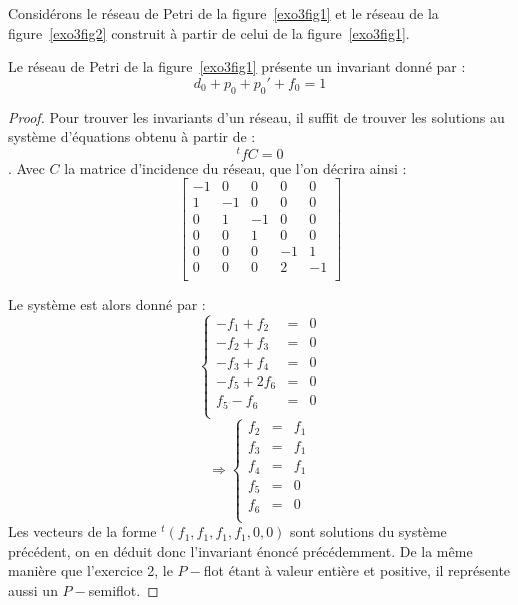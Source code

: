Considérons le réseau de Petri de la figure~\ref{exo3fig1} et le réseau de la figure~\ref{exo3fig2}
construit à partir de celui de la figure~\ref{exo3fig1}.

\begin{thrm}
    Le réseau de Petri de la figure~\ref{exo3fig1} présente un invariant donné par :
    \[
        d_0 + p_0 + p_0' + f_0 = 1 
    \]
\end{thrm}

\begin{proof}
    Pour trouver les invariants d'un réseau, il suffit de trouver les solutions au système
    d'équations obtenu à partir de : \[
        ^tfC = 0
    \]. Avec $C$ la matrice d'incidence du réseau, que l'on décrira ainsi :
    \[
        \left [ \begin{array}{ccccc}
            -1 & 0 & 0 & 0 & 0 \\
            1 & -1 & 0 & 0 & 0 \\
            0 & 1 & -1 & 0 & 0 \\
            0 & 0 & 1 & 0 & 0 \\
            0 & 0 & 0 & -1 & 1 \\
            0 & 0 & 0 & 2 & -1 \\
        \end{array}
        \right ]
    \]

    Le système est alors donné par : \[
        \left \lbrace \begin{array}{rcl}
            -f_1 + f_2 & = & 0 \\
            -f_2 + f_3 & = & 0 \\
            -f_3 + f_4 & = & 0 \\
            -f_5 + 2f_6 & = & 0 \\
            f_5 - f_6 & = & 0 \\
        \end{array}
        \right .
    \]
    \[
        \Rightarrow \left \lbrace \begin{array}{rcl}
            f_2 & = & f_1 \\
            f_3 & = & f_1 \\
            f_4 & = & f_1 \\
            f_5 & = & 0 \\
            f_6 & = & 0 \\
        \end{array}
        \right .
    \]
    Les vecteurs de la forme $^t(f_1, f_1, f_1, f_1, 0, 0)$ sont solutions du système précédent, on
    en déduit donc l'invariant énoncé précédemment. De la même manière que l'exercice 2, le $P-$flot
    étant à valeur entière et positive, il représente aussi un $P-$semiflot.
\end{proof}

